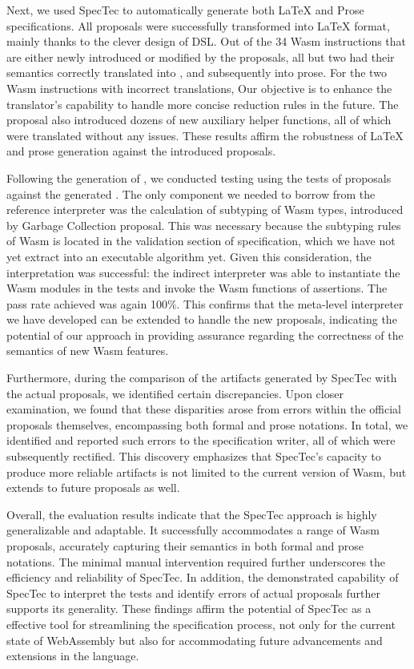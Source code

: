 Next, we used SpecTec to automatically generate both LaTeX and Prose
specifications.  All proposals were successfully transformed into LaTeX format,
mainly thanks to the clever design of DSL.  Out of the 34 Wasm instructions
that are either newly introduced or modified by the proposals, all but two had
their semantics correctly translated into \al, and subsequently into prose. For
the two Wasm instructions with incorrect translations,  Our objective is to
enhance the translator's capability to handle more concise reduction rules in
the future. The proposal also introduced dozens of new auxiliary helper
functions, all of which were translated without any issues.  These results
affirm the robustness of LaTeX and prose generation against the introduced
proposals.

Following the generation of \al, we conducted testing using the tests of
proposals against the generated \al.  The only component we needed to borrow
from the reference interpreter was the calculation of subtyping of Wasm types,
introduced by Garbage Collection proposal. This was necessary because the
subtyping rules of Wasm is located in the validation section of specification,
which we have not yet extract into an executable algorithm yet.  Given this
consideration, the interpretation was successful: the indirect interpreter was
able to instantiate the Wasm modules in the tests and invoke the Wasm functions
of assertions.  The pass rate achieved was again 100\%.  This confirms that the
meta-level interpreter we have developed can be extended to handle the new
proposals, indicating the potential of our approach in providing assurance
regarding the correctness of the semantics of new Wasm features.

Furthermore, during the comparison of the artifacts generated by SpecTec with
the actual proposals, we identified certain discrepancies. Upon closer
examination, we found that these disparities arose from errors within the
official proposals themselves, encompassing both formal and prose notations. In
total, we identified and reported  such errors to the specification
writer, all of which were subsequently rectified.  This discovery emphasizes
that SpecTec's capacity to produce more reliable artifacts is not limited to
the current version of Wasm, but extends to future proposals as well.

Overall, the evaluation results indicate that the SpecTec approach is highly
generalizable and adaptable. It successfully accommodates a range of Wasm
proposals, accurately capturing their semantics in both formal and prose
notations. The minimal manual intervention required further underscores the
efficiency and reliability of SpecTec.  In addition, the demonstrated
capability of SpecTec to interpret the tests and identify errors of actual
proposals further supports its generality.  These findings affirm the
potential of SpecTec as a effective tool for streamlining the specification
process, not only for the current state of WebAssembly but also for
accommodating future advancements and extensions in the language.

